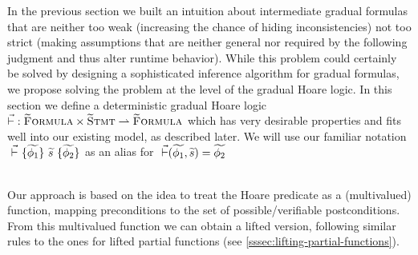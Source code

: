%
%
%
%

In the previous section we built an intuition about intermediate gradual formulas that are neither too weak (increasing the chance of hiding inconsistencies) not too strict (making assumptions that are neither general nor required by the following judgment and thus alter runtime behavior).
While this problem could certainly be solved by designing a sophisticated inference algorithm for gradual formulas, we propose solving the problem at the level of the gradual Hoare logic.
In this section we define a deterministic gradual Hoare logic $\vec{\vdash} : \textup{\textsc{\ensuremath{\widetilde{\text{F}}}ormula}} \times \textup{\textsc{\ensuremath{\widetilde{\text{S}}}tmt}} \rightharpoonup \textup{\textsc{\ensuremath{\widetilde{\text{F}}}ormula}}$ which has very desirable properties and fits well into our existing model, as described later.
We will use our familiar notation ${} \,\,\vec{\vdash}\,\, \{{\widetilde{\phi_1}}\} ~{\widetilde{s}}~ \{{\widetilde{\phi_2}}\}$ as an alias for $~\vec{\vdash}(\widetilde{\phi_1}, \widetilde{s}) = \widetilde{\phi_2}$

~\\
Our approach is based on the idea to treat the Hoare predicate as a (multivalued) function, mapping preconditions to the set of possible/verifiable postconditions.
From this multivalued function we can obtain a lifted version, following similar rules to the ones for lifted partial functions (see \ref{sssec:lifting-partial-functions}).

